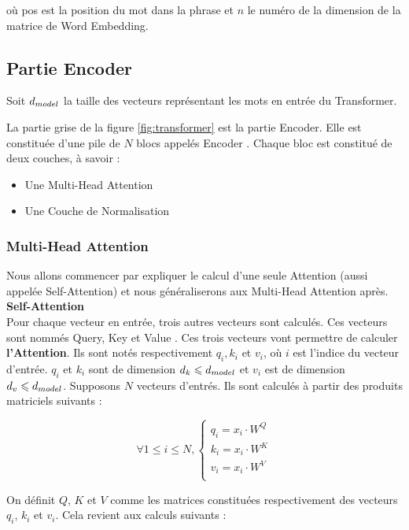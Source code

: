 où \og pos \fg{} est la position du mot dans la phrase et $n$ le numéro de la dimension de la matrice de Word Embedding.

\subsection{Partie Encoder}

Soit $d_{model}$ la taille des vecteurs représentant les mots en entrée du Transformer.

La partie grise de la figure \ref{fig:transformer} est la partie Encoder. Elle est constituée d'une pile de $N$ blocs appelés \og Encoder \fg{}.
Chaque bloc est constitué de deux couches, à savoir :
\begin{itemize}
\item Une Multi-Head Attention
\item Une Couche de Normalisation
\end{itemize}


\subsubsection{Multi-Head Attention}

Nous allons commencer par expliquer le calcul d'une seule Attention (aussi appelée Self-Attention) et nous généraliserons aux Multi-Head Attention après. \\

\textbf{Self-Attention} \\

Pour chaque vecteur en entrée, trois autres vecteurs sont calculés. Ces vecteurs sont nommés \og Query, Key et Value \fg{}.
Ces trois vecteurs vont permettre de calculer \textbf{l'Attention}.
Ils sont notés respectivement $q_i, k_i$ et $v_i$, où $i$ est l'indice du vecteur d'entrée. $q_i$ et $k_i$ sont de dimension
$d_k \leqslant d_{model}$ et $v_i$ est de dimension $d_v \leqslant d_{model}$.
Supposons $N$ vecteurs d'entrés. Ils sont calculés à partir des produits matriciels suivants :

\[ \forall 1 \leq i \leq N,
  \begin{cases}
  q_i = x_i \cdot W^Q \\
  k_i = x_i \cdot W^K \\
  v_i = x_i \cdot W^V \\
  \end{cases}  \]

On définit $Q$, $K$ et $V$ comme les matrices constituées respectivement des vecteurs $q_i$, $k_i$ et $v_i$.
Cela revient aux calculs suivants :

